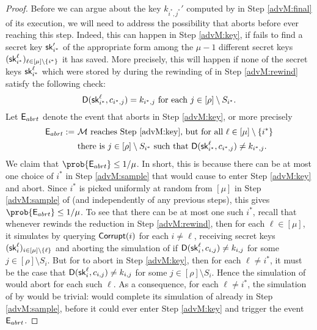 \begin{proof}
  Before we can argue about the key \(k_{i^{*},j^{*}}'\) computed by
  \redM in Step \ref{advM:final} of its execution,
  we will need to address the possibility that \redM aborts
  before ever reaching this step.
  Indeed, this can happen in Step \ref{advM:key},
  if \redM fails to find a secret key \(\mathsf{sk}_{i^{*}}'\)
  of the appropriate form among the \(\mu - 1\)
  different secret keys \((\mathsf{sk}_{i^{*}}^{\ell})_{\ell \in [\mu] \setminus \{i^{*}\}}\) it has saved.
  More precisely, this will happen if
  none of the secret keys \(\mathsf{sk}_{i^{*}}^{\ell}\)
  which were stored by \redM during the rewinding of \redR in Step \ref{advM:rewind}
  satisfy the following check:
  \begin{equation}\label{skcheck}
  \mathsf{D}(\mathsf{sk}_{i^{*}}^{\ell},c_{i^{*},j}) = k_{i^{*},j}
  \text{ for each } j \in [\rho] \setminus S_{i^{*}}.
  \end{equation}
  Let \(\mathsf{E}_{abrt}\) denote the event that \redM aborts in Step \ref{advM:key}, or more precisely
  \begin{align}
    \eventE_{abrt} := & \text{ \redM reaches Step \ref{advM:key}, but for all } \ell \in [\mu] \setminus \{i^{*}\}\notag\\
    & \text{ there is } j \in [\rho] \setminus S_{i^{*}}
    \text{ such that } \Decaps(\sk_{i^{*}}^{\ell},c_{i^{*},j}) \ne k_{i^{*},j}. \notag
  \end{align}
  We claim that \(\prob{\eventE_{abrt}} \le 1/\mu\).
  In short, this is because there can be at most one choice of \(i^{*}\)
  in Step \ref{advM:sample} that would cause \redM to enter Step \ref{advM:key} and abort.
  Since \(i^{*}\) is picked uniformly at random from \([\mu]\)
  in Step \ref{advM:sample} of \redM (and independently of any previous steps),
  this gives \(\prob{\eventE_{abrt}} \le 1/\mu\).
  To see that there can be at most one such \(i^{*}\),
  recall that whenever \redM rewinds the reduction \redR
  in Step \ref{advM:rewind},
  then for each \(\ell \in [\mu]\),
  it simulates \advA by querying \(\mathsf{Corrupt}(i)\) for each \(i \ne \ell\),
  receiving secret keys \((\mathsf{sk}_{i}^{\ell})_{i \in [\mu] \setminus \{\ell\}}\)
  and aborting the simulation of \advA if
  \(\mathsf{D}(\mathsf{sk}_{i}^{\ell},c_{i,j}) \ne k_{i,j}\) for some \(j \in [\rho] \setminus S_{i}\).
  But for \redM to abort in Step \ref{advM:key},
  then for each \(\ell \ne i^{*}\),
  it must be the case that
  \(\mathsf{D}(\mathsf{sk}_{i}^{\ell},c_{i,j}) \ne k_{i,j}\) for some \(j \in [\rho] \setminus S_{i}\).
  Hence the simulation of \advA would abort for each such \(\ell\).
  As a consequence, for each \(\ell \ne i^{*}\), the simulation of \advA by \redM would be trivial:
  \redM would complete its simulation of \advA already in Step \ref{advM:sample},
  before it could ever enter Step \ref{advM:key} and trigger the event \(\mathsf{E}_{abrt}\).


\end{proof}
